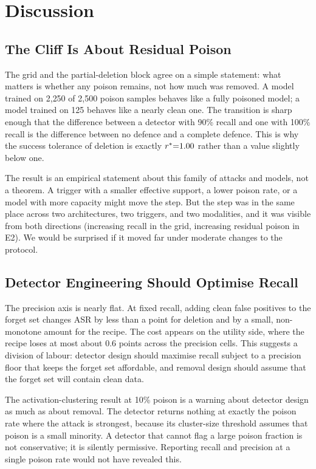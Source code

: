 \section{Discussion}
\label{sec:discussion}

\subsection{The Cliff Is About Residual Poison}
The grid and the partial-deletion block agree on a simple statement: what
matters is whether any poison remains, not how much was removed. A model trained
on 2{,}250 of 2{,}500 poison samples behaves like a fully poisoned model; a model
trained on 125 behaves like a nearly clean one. The transition is sharp enough
that the difference between a detector with 90\% recall and one with 100\% recall
is the difference between no defence and a complete defence. This is why the
success tolerance of deletion is exactly $r^{\ast}{=}1.00$ rather than a value
slightly below one.

The result is an empirical statement about this family of attacks and models, not
a theorem. A trigger with a smaller effective support, a lower poison rate, or a
model with more capacity might move the step. But the step was in the same place
across two architectures, two triggers, and two modalities, and it was visible
from both directions (increasing recall in the grid, increasing residual poison
in E2). We would be surprised if it moved far under moderate changes to the
protocol.

\subsection{Detector Engineering Should Optimise Recall}
The precision axis is nearly flat. At fixed recall, adding clean false positives
to the forget set changes ASR by less than a point for deletion and by a small,
non-monotone amount for the recipe. The cost appears on the utility side, where
the recipe loses at most about 0.6 points across the precision cells. This
suggests a division of labour: detector design should maximise recall subject to
a precision floor that keeps the forget set affordable, and removal design should
assume that the forget set will contain clean data.

The activation-clustering result at 10\% poison is a warning about detector
design as much as about removal. The detector returns nothing at exactly the
poison rate where the attack is strongest, because its cluster-size threshold
assumes that poison is a small minority. A detector that cannot flag a large
poison fraction is not conservative; it is silently permissive. Reporting recall
and precision at a single poison rate would not have revealed this.

